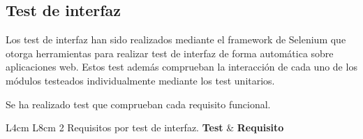 \subsection{Test de interfaz}

Los test de interfaz han sido realizados mediante el framework de Selenium que otorga herramientas para realizar test de interfaz de forma automática sobre aplicaciones web. Estos test además comprueban la interacción de cada uno de los módulos testeados individualmente mediante los test unitarios.

Se ha realizado test que comprueban cada requisito funcional.




{L{4cm} L{8cm}}
{2}
{Requisitos por test de interfaz.}
{\textbf{Test} & \textbf{Requisito} \\}
